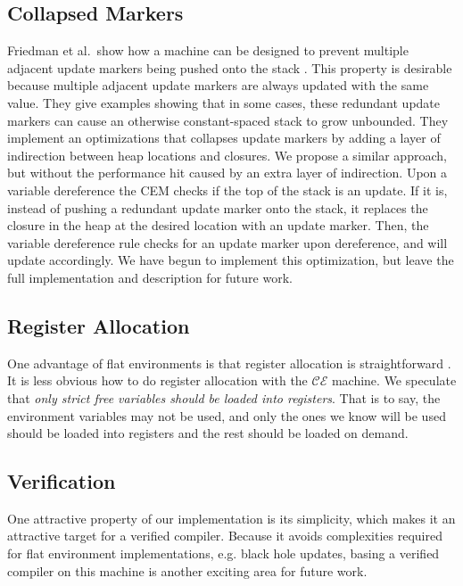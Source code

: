 \subsection{Collapsed Markers}
Friedman et al.\ show how a machine can be designed to prevent multiple adjacent
update markers being pushed onto the stack \cite{lkm}.  This property is
desirable because multiple adjacent update markers are always updated with the
same value. They give examples showing that in some cases, these redundant
update markers can cause an otherwise constant-spaced stack to grow unbounded.
They implement an optimizations that collapses update markers by adding a layer
of indirection between heap locations and closures. We propose a similar
approach, but without the performance hit caused by an extra layer of
indirection. Upon a variable dereference the CEM checks if the top of the stack
is an update. If it is, instead of pushing a redundant update marker onto the
stack, it replaces the closure in the heap at the desired location with an update
marker.  Then, the variable dereference rule checks for an update marker upon
dereference, and will update accordingly. We have begun to implement this
optimization, but leave the full implementation and description for future work.

\subsection{Register Allocation} \label{sec:alloc}
One advantage of flat environments is that register allocation is
straightforward \cite{appel2006compiling,jonesstg,terei2010llvm}. It is less
obvious how to do register allocation with the $\mathcal{CE}$ machine.
We speculate that \emph{only strict free variables should be loaded into
registers}. That is to say, the environment variables may not be used, and only
the ones we know will be used should be loaded into registers and the rest
should be loaded on demand.

\subsection{Verification}
One attractive property of our implementation is its simplicity, which makes it
an attractive target for a verified compiler. Because it avoids complexities
required for flat environment implementations, e.g. black hole updates, basing a
verified compiler on this machine is another exciting area for future work. 
